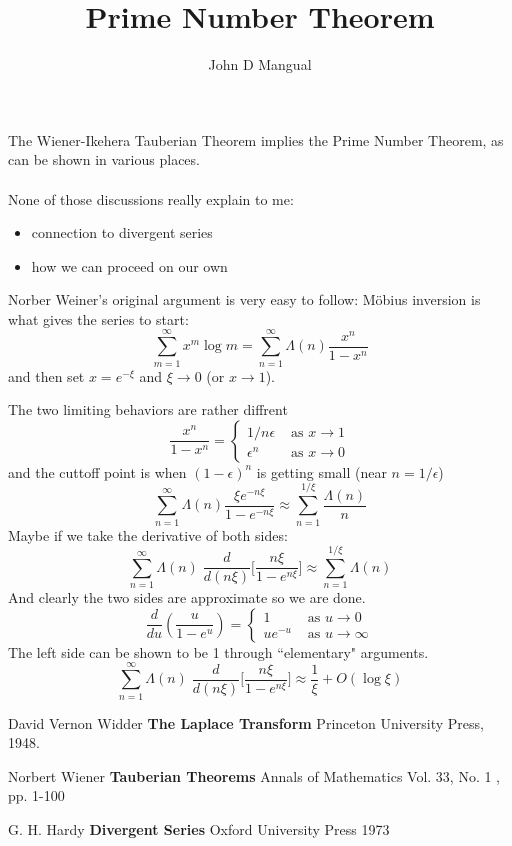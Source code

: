 \documentclass[12pt]{article}
\title{\textbf{Prime Number Theorem}}
\author{John D Mangual}
\date{}
\begin{document}
\selectfont \fontsize{25}{30}\selectfont

\maketitle

\noindent The Wiener-Ikehera Tauberian Theorem implies the Prime Number Theorem, as can be shown in various places. \\ \\ None of those discussions really explain to me:
\begin{itemize}
\item connection to divergent series
\item how we can proceed on our own
\end{itemize}
Norber Weiner's original argument is very easy to follow:
M\"{o}bius inversion is what gives the series to start:
$$ \sum_{m=1}^\infty x^m \log m = \sum_{n=1}^\infty \Lambda(n) \frac{x^n}{1-x^n} $$
and then set $x = e^{-\xi}$ and $\xi \to 0$ (or $x \to 1$). \newpage

\noindent
The two limiting behaviors are rather diffrent
$$  \frac{x^n}{1 - x^n}  = \left\{  \begin{array}{rl}
1/n\epsilon & \text{ as }x \to 1 \\
\epsilon^n & \text{ as } x \to 0 \end{array}\right. $$
and the cuttoff point is when $(1 - \epsilon)^n$ is getting small (near $n = 1/\epsilon$)
$$ \sum_{n=1}^\infty \Lambda(n) \frac{\xi e^{-n\xi}}{1-e^{-n\xi}} \approx \sum_{n=1}^{1/\xi} \frac{\Lambda(n)}{n} $$
Maybe if we take the derivative of both sides:
$$  \sum_{n=1}^\infty \Lambda(n) \; \frac{d}{d(n\xi)}\bigg[ \frac{n\xi }{1-e^{n\xi}} \bigg]  \approx \sum_{n=1}^{1/\xi} \Lambda(n) $$
 And clearly the two sides are approximate so we are done.
$$ \frac{d}{du} \left( \frac{u}{1 - e^u} \right) = \left\{  \begin{array}{cl}
1 & \text{ as }u \to 0 \\
ue^{-u} & \text{ as } u \to \infty \end{array}\right. $$
The left side can be shown to be 1 through ``elementary" arguments. 
$$  \sum_{n=1}^\infty \Lambda(n) \; \frac{d}{d(n\xi)}\bigg[ \frac{n\xi }{1-e^{n\xi}} \bigg] \approx \frac{1}{\xi} + O(\log \xi)$$

\newpage

\selectfont \fontsize{12}{10}\selectfont


\begin{thebibliography}{}

\item David Vernon Widder \textbf{The Laplace Transform} Princeton University Press, 1948.

\item Norbert Wiener \textbf{Tauberian Theorems} Annals of Mathematics Vol. 33, No. 1 , pp. 1-100

\item G. H. Hardy \textbf{Divergent Series} Oxford University Press 1973

\end{thebibliography}
\end{document}
